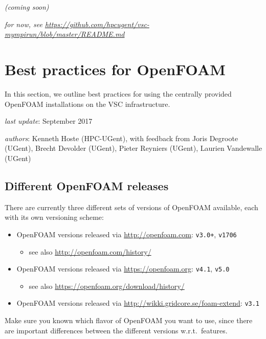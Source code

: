 \textit{(coming soon)}

\textit{for now, see {\small\url{https://github.com/hpcugent/vsc-mympirun/blob/master/README.md}}}


\section{Best practices for OpenFOAM}
\label{sec:best-practices-openfoam}

In this section, we outline best practices for using the centrally provided OpenFOAM installations
on the VSC \hpc infrastructure.

\textit{last update}: September 2017

\textit{authors}: Kenneth Hoste (HPC-UGent), with feedback from Joris Degroote (UGent), Brecht Devolder (UGent),
                  Pieter Reyniers (UGent), Laurien Vandewalle (UGent)


\subsection{Different OpenFOAM releases}
\label{sec:best-practices-openfoam-releases}

There are currently three different sets of versions of OpenFOAM available, each with its own versioning scheme:

\begin{itemize}
    \item OpenFOAM versions released via \url{http://openfoam.com}: \texttt{v3.0+}, \texttt{v1706}
    \begin{itemize}
        \item see also \url{http://openfoam.com/history/}
    \end{itemize}
    \item OpenFOAM versions released via \url{https://openfoam.org}: \texttt{v4.1}, \texttt{v5.0}
    \begin{itemize}
        \item see also \url{https://openfoam.org/download/history/}
    \end{itemize}
    \item OpenFOAM versions released via \url{http://wikki.gridcore.se/foam-extend}: \texttt{v3.1}
\end{itemize}

Make sure you known which flavor of OpenFOAM you want to use, since there are important differences between
the different versions w.r.t.\ features.

